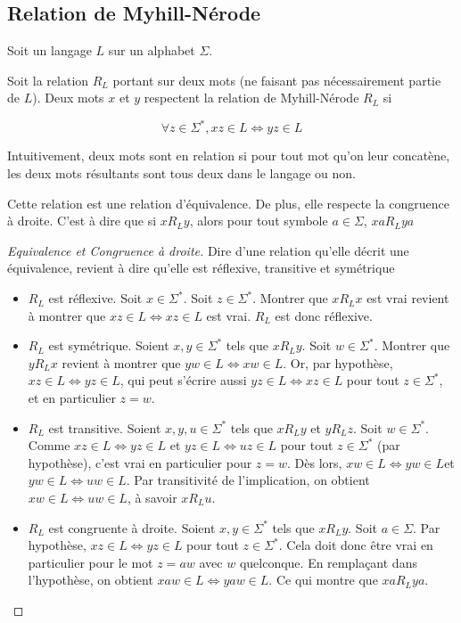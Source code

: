 \subsection{Relation de Myhill-Nérode}

Soit un langage $L$ sur un alphabet $\Sigma$.

Soit la relation $R_L$ portant sur deux mots (ne faisant pas nécessairement partie de $L$). Deux mots $x$ et $y$ respectent la relation de Myhill-Nérode $R_L$ si 

$$\forall z \in \Sigma^*, xz \in L \Leftrightarrow yz \in L$$

Intuitivement, deux mots sont en relation si pour tout mot qu'on leur concatène, les deux mots résultants sont tous deux dans le langage ou non.

\begin{lemma}
	Cette relation est une relation d'équivalence. De plus, elle respecte la congruence à droite. C'est à dire que si $xR_Ly$, alors pour tout symbole $a \in \Sigma$, $xaR_Lya$
\end{lemma}

\begin{proof}[Equivalence et Congruence à droite]
	Dire d'une relation qu'elle décrit une équivalence, revient à dire qu'elle est réflexive, transitive et symétrique
\begin{itemize}
		\item $R_L$ est réflexive. Soit $x \in \Sigma^*$. Soit $z \in \Sigma^*$. Montrer que $xR_Lx$ est vrai revient à montrer que $ xz \in L \Leftrightarrow xz \in L$ est vrai. $R_L$ est donc réflexive.
		\item $R_L$ est symétrique. Soient $x, y \in \Sigma^*$ tels que $xR_Ly$. Soit $w \in \Sigma^*$. Montrer que $yR_Lx$ revient à montrer que $ yw \in L \Leftrightarrow xw \in L$. Or, par hypothèse, $ xz \in L \Leftrightarrow yz \in L$, qui peut s'écrire aussi $ yz \in L \Leftrightarrow xz \in L$ pour tout $z \in \Sigma^*$, et en particulier $z=w$.
		\item $R_L$ est transitive. Soient $x,y,u \in \Sigma^*$ tels que $xR_Ly$ et $yR_Lz$. Soit $w \in \Sigma^*$. Comme $ xz \in L \Leftrightarrow yz \in L$ et $ yz \in L \Leftrightarrow uz \in L$ pour tout $z \in \Sigma^*$ (par hypothèse), c'est vrai en particulier pour $z=w$. Dès lors,  $ xw \in L \Leftrightarrow yw \in L$et $ yw \in L \Leftrightarrow uw \in L$. Par transitivité de l'implication, on obtient $ xw \in L \Leftrightarrow uw \in L$, à savoir $xR_Lu$.
		\item $R_L$ est congruente à droite. Soient $x,y \in \Sigma^*$ tels que $xR_Ly$. Soit $a \in \Sigma$. Par hypothèse, $ xz \in L \Leftrightarrow yz \in L$ pour tout $z \in \Sigma^*$. Cela doit donc être vrai en particulier pour le mot $z=aw$ avec $w$ quelconque. En remplaçant dans l'hypothèse, on obtient  $ xaw \in L \Leftrightarrow yaw \in L$. Ce qui montre que $xaR_Lya$.
	\end{itemize}
\end{proof}


